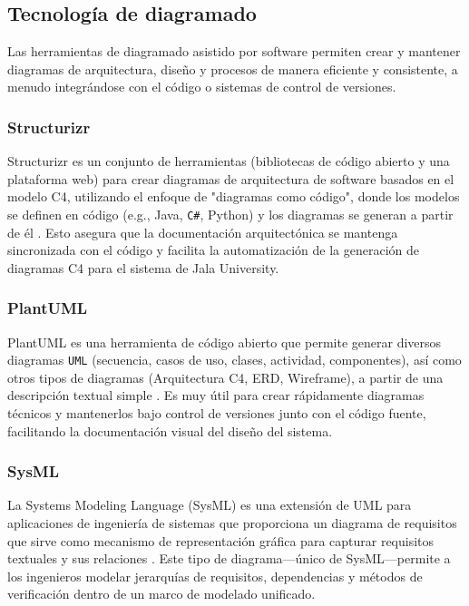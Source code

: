 \subsection{Tecnología de diagramado}
Las herramientas de diagramado asistido por software permiten crear y mantener diagramas de arquitectura, diseño y procesos de manera eficiente y consistente, a menudo integrándose con el código o sistemas de control de versiones.

\subsubsection{Structurizr}
Structurizr es un conjunto de herramientas (bibliotecas de código abierto y una plataforma web) para crear diagramas de arquitectura de software basados en el modelo C4, utilizando el enfoque de "diagramas como código", donde los modelos se definen en código (e.g., Java, \texttt{C\#}, Python) y los diagramas se generan a partir de él \parencite{BrownStructurizr}.
Esto asegura que la documentación arquitectónica se mantenga sincronizada con el código y facilita la automatización de la generación de diagramas C4 para el sistema de Jala University.

\subsubsection{PlantUML}
PlantUML es una herramienta de código abierto que permite generar diversos diagramas \texttt{UML} (secuencia, casos de uso, clases, actividad, componentes), así como otros tipos de diagramas (Arquitectura C4, ERD, Wireframe), a partir de una descripción textual simple \parencite{PlantUML}.
Es muy útil para crear rápidamente diagramas técnicos y mantenerlos bajo control de versiones junto con el código fuente, facilitando la documentación visual del diseño del sistema.

\subsubsection{SysML}
La Systems Modeling Language (SysML) es una extensión de UML para aplicaciones de ingeniería de sistemas que proporciona un diagrama de requisitos que sirve como mecanismo de representación gráfica para capturar requisitos textuales y sus relaciones \parencite{Friedenthal2014}.
Este tipo de diagrama—único de SysML—permite a los ingenieros modelar jerarquías de requisitos, dependencias y métodos de verificación dentro de un marco de modelado unificado.

